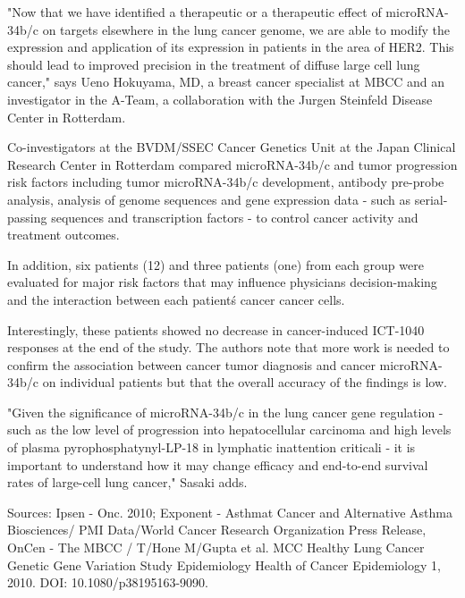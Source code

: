 \documentclass{article}
\begin{document}
"Now that we have identified a therapeutic or a therapeutic effect of microRNA-34b/c on targets elsewhere in the lung cancer genome, we are able to modify the expression and application of its expression in patients in the area of HER2. This should lead to improved precision in the treatment of diffuse large cell lung cancer," says Ueno Hokuyama, MD, a breast cancer specialist at MBCC and an investigator in the A-Team, a collaboration with the Jurgen Steinfeld Disease Center in Rotterdam.

Co-investigators at the BVDM/SSEC Cancer Genetics Unit at the Japan Clinical Research Center in Rotterdam compared microRNA-34b/c and tumor progression risk factors including tumor microRNA-34b/c development, antibody pre-probe analysis, analysis of genome sequences and gene expression data - such as serial-passing sequences and transcription factors - to control cancer activity and treatment outcomes.

In addition, six patients (12) and three patients (one) from each group were evaluated for major risk factors that may influence physicians decision-making and the interaction between each patient\'s cancer cancer cells.

Interestingly, these patients showed no decrease in cancer-induced ICT-1040 responses at the end of the study. The authors note that more work is needed to confirm the association between cancer tumor diagnosis and cancer microRNA-34b/c on individual patients but that the overall accuracy of the findings is low.

"Given the significance of microRNA-34b/c in the lung cancer gene regulation - such as the low level of progression into hepatocellular carcinoma and high levels of plasma pyrophosphatynyl-LP-18 in lymphatic inattention criticali - it is important to understand how it may change efficacy and end-to-end survival rates of large-cell lung cancer," Sasaki adds.

Sources: Ipsen - Onc. 2010; Exponent - Asthmat Cancer and Alternative Asthma Biosciences/ PMI Data/World Cancer Research Organization Press Release, OnCen - The MBCC / T/Hone M/Gupta et al. MCC Healthy Lung Cancer Genetic Gene Variation Study Epidemiology Health of Cancer Epidemiology 1, 2010. DOI: 10.1080/p38195163-9090.
\end{document}
